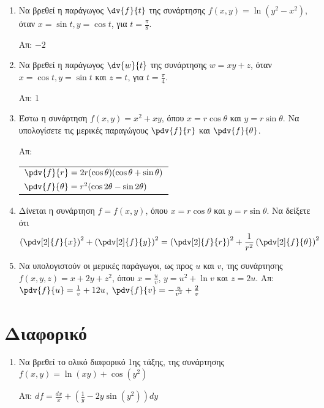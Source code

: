 \begin{enumerate}

  \item Να βρεθεί η παράγωγος $\dv{f}{t}$ της συνάρτησης 
    $f(x,y)=\ln(y^2-x^2)$, όταν $x=\sin t, y=\cos t$, για $t=\frac{\pi}{8}$.

    \hfill Απ: $-2$

  \item Να βρεθεί η παράγωγος $\dv{w}{t}$ της συνάρτησης 
    $ w = xy+z $, όταν $ x = \cos{t}, y = \sin{t}$ και $ z = t $, για 
    $ t = \frac{ \pi }{ 4 } $.

    \hfill Απ: 1

  \item Έστω η συνάρτηση  $ f(x,y) = x^{2} + xy $, όπου $ x=r \cos{\theta} $ και 
    $ y= r \sin{\theta} $. 
    Να υπολογίσετε τις μερικές παραγώγους $ \pdv{f}{r} $ και $ \pdv{f}{\theta} $.  

    \hfill Απ: \begin{tabular}{l}
      $ \pdv{f}{r} = 2r(\cos{\theta} )(\cos{\theta} + \sin{\theta}) $ \\[10pt]
      $ \pdv{f}{\theta}=r^{2}(\cos{2\theta} - \sin{2 \theta}) $
    \end{tabular}

  \item Δίνεται η συνάρτηση $ f = f(x,y) $, όπου $ x=r \cos{\theta} $ και 
    $ y= r \sin{\theta} $. Να δείξετε ότι 
    \[
      \left(\pdv[2]{f}{x}\right)^{2} + \left(\pdv[2]{f}{y}\right)^{2} = 
      \left(\pdv[2]{f}{r}\right)^{2} + \frac{1}{r^{2}} 
      \left(\pdv[2]{f}{\theta}\right)^{2}
    \] 

  \item Να υπολογιστούν οι μερικές παράγωγοι, ως προς $u$ και $v$, 
    της συνάρτησης $ f(x,y,z) = x + 2y + z^{2}$, όπου $ x = \frac{ u }{ v } $, 
    $y = u^{2} + \ln{v} $ και $ z = 2u $.
    \hfill Απ: $ \pdv{f}{u} = \frac{1}{ v } + 12u $, 
    $\pdv{f}{v} = -\frac{ u }{ v^{2} } + \frac{ 2 }{ v } $

\end{enumerate}

\section*{Διαφορικό}

\begin{enumerate}
  \item Να βρεθεί το ολικό διαφορικό 1ης τάξης, της συνάρτησης 
    $f(x,y)=\ln(xy)+\cos(y^2)$ 

    \hfill Απ: $df=\frac{dx}{x}+\left(\frac{1}{y}-2y\sin(y^2)\right)dy$


\end{enumerate}


